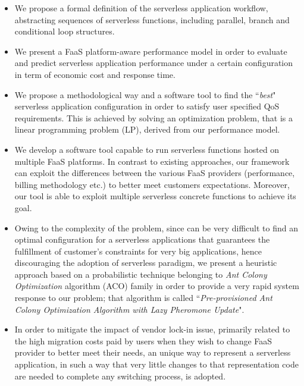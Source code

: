 \documentclass[12pt,a4paper]{report}
\newcommand{\ItalicQuotMark}[1]{``\textit{#1}"}
\begin{document}
\begin{itemize}
	\item We propose a formal definition of the serverless application workflow, abstracting sequences of serverless functions, including parallel, branch and conditional loop structures. 
	
	\item We present a FaaS platform-aware performance model in order to evaluate and predict serverless application performance under a certain configuration in term of economic cost and response time. 
		
	\item We propose a methodological way and a software tool to find the \ItalicQuotMark{best} serverless application configuration in order to satisfy user specified QoS requirements. This is achieved by solving an optimization problem, that is a linear programming problem (LP), derived from our performance model.
		
	\item We develop a software tool capable to run serverless functions hosted on multiple FaaS platforms. In contrast to existing approaches, our framework can exploit the differences between the various FaaS providers (performance, billing methodology etc.) to better meet customers expectations. Moreover, our tool is able to exploit multiple serverless concrete functions to achieve its goal.
	
	\item Owing to the complexity of the problem, since can be very difficult to find an optimal configuration for a serverless applications that guarantees the fulfillment of customer's constraints for very big applications, hence discouraging the adoption of serverless paradigm, we present a heuristic approach based on a probabilistic technique belonging to \textit{Ant Colony Optimization} algorithm (ACO) family in order to provide a very rapid system response to our problem; that algorithm is called \ItalicQuotMark{Pre-provisioned Ant Colony Optimization Algorithm with Lazy Pheromone Update}.
	
	\item In order to mitigate the impact of vendor lock-in issue, primarily related to the high migration costs paid by users when they wish to change FaaS provider to better meet their needs, an unique way to represent a serverless application, in such a way that very little changes to that representation code are needed to complete any switching process, is adopted. 
	

\end{itemize}
\end{document}
